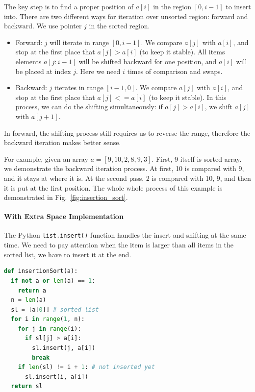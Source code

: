 \documentclass[../main.tex]{subfiles}
\begin{document}
The key step is to find a proper position of $a[i]$ in the region $[0, i-1]$ to insert into. There are two different ways for iteration over unsorted region: forward and backward. We use pointer $j$ in the sorted region.
\begin{itemize}
    \item Forward: $j$ will iterate in range $[0, i-1]$. We compare $a[j]$ with $a[i]$, and stop at the first place that $a[j] > a[i]$ (to keep it stable).  All items elements $a[j:i-1]$ will be shifted backward for one position, and $a[i]$ will be placed at index $j$. Here we need $i$ times of comparison and swaps. 
    
    \item Backward: $j$ iterates in range $[i-1, 0]$. We compare $a[j]$ with $a[i]$, and stop at the first place that $a[j] <= a[i]$ (to keep it stable). In this process, we can do the shifting simultaneously: if $a[j] > a[i]$, we shift $a[j]$ with $a[j+1]$. 
\end{itemize}
In forward, the shifting process still requires us to reverse the range,
therefore the backward iteration makes better sense.

For example, given an array $a = [9, 10, 2, 8, 9, 3]$. First, 9 itself is sorted array. we demonstrate the backward iteration process. At first, 10 is compared with 9, and it stays at where it is. At the second pass, 2 is compared with 10, 9, and then it is put at the first position. The whole  whole process of this example is demonstrated in Fig.~\ref{fig:insertion_sort}. 




\paragraph{With Extra Space Implementation} The Python \texttt{list.insert()} function handles the insert and shifting at the same time. We need to pay attention when the item is larger than all items in the sorted list, we have to insert it at the end.
\begin{lstlisting}[language=Python]
def insertionSort(a):
  if not a or len(a) == 1:
    return a
  n = len(a)
  sl = [a[0]] # sorted list
  for i in range(1, n):
    for j in range(i):
      if sl[j] > a[i]:
        sl.insert(j, a[i])
        break
    if len(sl) != i + 1: # not inserted yet
      sl.insert(i, a[i])
  return sl
\end{lstlisting}
\end{document}
